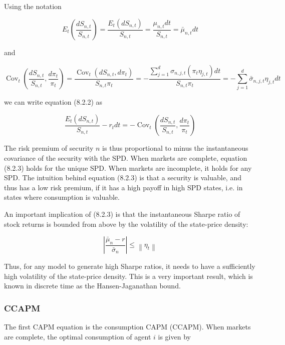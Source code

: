 \documentclass[\topdir/lecture\_notes.tex]{subfiles}
\begin{document}
Using the notation

\begin{equation}
E_{t}\left(\frac{d S_{n, t}}{S_{n, t}}\right)=\frac{E_{t}\left(d S_{n, t}\right)}{S_{n, t}}=\frac{\mu_{n, t} d t}{S_{n, t}}=\bar{\mu}_{n, t} d t
\end{equation}

and

\begin{equation}
\operatorname{Cov}_{t}\left(\frac{d S_{n, t}}{S_{n, t}}, \frac{d \pi_{t}}{\pi_{t}}\right)=\frac{\operatorname{Cov}_{t}\left(d S_{n, t}, d \pi_{t}\right)}{S_{n, t} \pi_{t}}=-\frac{\sum_{j=1}^{d} \sigma_{n, j, t}\left(\pi_{t} \eta_{j, t}\right) d t}{S_{n, t} \pi_{t}}=-\sum_{j=1}^{d} \bar{\sigma}_{n, j, t} \eta_{j, t} d t
\end{equation}

we can write equation (8.2.2) as

\begin{equation}
\frac{E_{t}\left(d S_{n, t}\right)}{S_{n, t}}-r_{t} d t=-\operatorname{Cov}_{t}\left(\frac{d S_{n, t}}{S_{n, t}}, \frac{d \pi_{t}}{\pi_{t}}\right) \label{eq:8.2.3}
\end{equation}

The risk premium of security \(n\) is thus proportional to minus the instantaneous covariance of the security with the SPD. When markets are complete, equation (8.2.3) holds for the unique SPD. When markets are incomplete, it holds for any SPD. The intuition behind equation (8.2.3) is that a security is valuable, and thus has a low risk premium, if it has a high payoff in high SPD states, i.e. in states where consumption is valuable.

An important implication of (8.2.3) is that the instantaneous Sharpe ratio of stock returns is bounded from above by the volatility of the state-price density:

\begin{equation}
\left|\frac{\bar{\mu}_{n}-r}{\bar{\sigma}_{n}}\right| \leq\left\|\eta_{t}\right\| \label{eq:8.2.4}
\end{equation}

Thus, for any model to generate high Sharpe ratios, it needs to have a sufficiently high volatility of the state-price density. This is a very important result, which is known in discrete time as the Hansen-Jaganathan bound.

\subsubsection{CCAPM}
The first CAPM equation is the consumption CAPM (CCAPM). When markets are complete, the optimal consumption of agent \(i\) is given by
\end{document}
